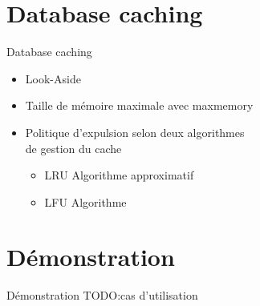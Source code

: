 \documentclass[aspectratio=169]{beamer}
\newcommand{\TODO}{TODO:}
\begin{document}
\section{Database caching}
\begin{frame}{Database caching}
\begin{itemize}
  \item Look-Aside 
  \item Taille de mémoire maximale avec maxmemory
  \item Politique d'expulsion selon deux algorithmes \\ de gestion du cache
  \begin{itemize}
    \item LRU Algorithme approximatif
    \item LFU Algorithme
 \end{itemize}
\end{itemize}
\end{frame}

\section{Démonstration}
\begin{frame}{Démonstration}
\TODO cas d'utilisation
\end{frame}
\end{document}
